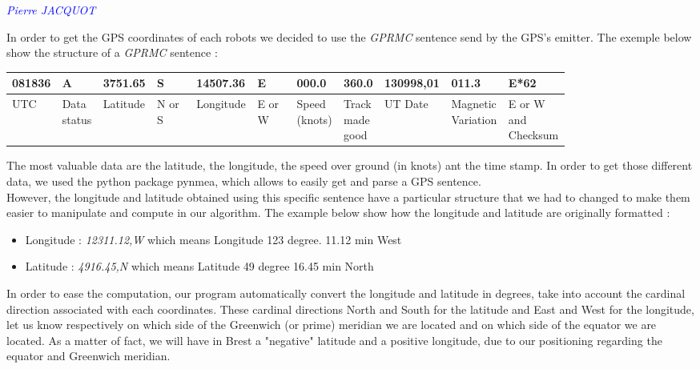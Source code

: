 \textcolor{blue}{\textit{Pierre JACQUOT}}

In order to get the GPS coordinates of each robots we decided to use the \textit{GPRMC} sentence send by the GPS's emitter. The exemple below show the structure of a \textit{GPRMC} sentence : \
\begin{center}
\begin{tabular}{|m{0.06\linewidth}|m{0.06\linewidth}|m{0.08\linewidth}|m{0.07\linewidth}|m{0.09\linewidth}|m{0.07\linewidth}|m{0.07\linewidth}|m{0.05\linewidth}|m{0.09\linewidth}|m{0.1\linewidth}|m{0.07\linewidth}|}
\hline
    081836 & A & 3751.65 & S & 14507.36 & E & 000.0 & 360.0 & 130998,01 & 011.3 & E*62  \\ \hline
     UTC & Data status & Latitude & N or S & Longitude & E or W & Speed (knots) & Track made good &  UT Date & Magnetic Variation & E or W and Checksum \\ \hline

\end{tabular}
\end{center}
The most valuable data are the latitude, the longitude, the speed over ground (in knots) ant the time stamp. In order to get those different data, we used the python package pynmea, which allows to easily get and parse a GPS sentence. \\
However, the longitude and latitude obtained using this specific sentence have a particular structure that we had to changed to make them easier to manipulate and compute in our algorithm. The example below show how the longitude and latitude are originally formatted :
\
\begin{itemize}
  \item Longitude  : \textit{12311.12,W} which means Longitude 123 degree. 11.12 min West
  \item Latitude : \textit{4916.45,N} which means Latitude 49 degree 16.45 min North
\end{itemize}

In order to ease the computation, our program automatically convert the longitude and latitude in degrees, take into account the cardinal direction associated with each coordinates.
These cardinal directions North and South for the latitude and East and West for the longitude, let us know respectively on which side of the Greenwich (or prime) meridian we are located and on which side of the equator we are located. As a matter of fact, we will have in Brest a "negative" latitude and a positive longitude, due to our positioning regarding the equator and Greenwich meridian.\\

